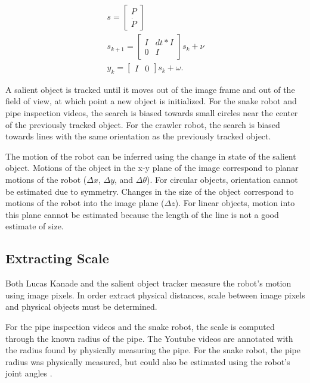 \documentclass[letterpaper, 10 pt, conference]{ieeeconf}
\begin{document}
\begin{eqnarray*}
s = \begin{bmatrix} P \\ \dot{P} \end{bmatrix} \\
s_{k+1} = \begin{bmatrix} I & dt * I \\ 0 & I \end{bmatrix} s_{k} + \nu \\
y_k = \begin{bmatrix} I & 0 \end{bmatrix} s_k + \omega.
\end{eqnarray*}


A salient object is tracked until it moves out of the image frame and out of the field of view, at which point a new object is initialized. For the snake robot and pipe inspection videos, the search is biased towards small circles near the center of the previously tracked object. For the crawler robot, the search is biased towards lines with the same orientation as the previously tracked object.

The motion of the robot can be inferred using the change in state of the salient object. Motions of the object in the x-y plane of the image correspond to planar motions of the robot  ($\Delta x$, $\Delta y$, and $\Delta \theta$). For circular objects, orientation cannot be estimated due to symmetry. Changes in the size of the object correspond to motions of the robot into the image plane ($\Delta z$). For linear objects, motion into this plane cannot be estimated because the length of the line is not a good estimate of size.

\subsection{Extracting Scale}

Both Lucas Kanade and the salient object tracker measure the robot's motion using image pixels. In order extract physical distances, scale between image pixels and physical objects must be determined.

For the pipe inspection videos and the snake robot, the scale is computed through the known radius of the pipe. The Youtube videos are annotated with the radius found by physically measuring the pipe. For the snake robot, the pipe radius was physically measured, but could also be estimated using the robot's joint angles \cite{Enner2013}.
\end{document}
